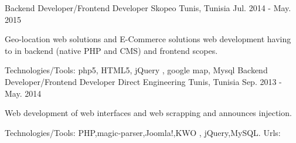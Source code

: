 \begin{cventries}
{    \href{http://www.ozeol.com/fr/}{} \break
    } 
  \techentries
    {Backend Developer/Frontend Developer}
    {Skopeo}
    {Tunis, Tunisia}
    {Jul. 2014 - May. 2015}
    {
      \begin{cvitems}
        \item {Geo-location web solutions and E-Commerce solutions web development having to in backend (native PHP and CMS) and frontend scopes.}
      \end{cvitems}
    }
    {\textcolor{awesome}{Technologies/Tools: } {\color{graytext}}  {php5, HTML5, jQuery , google map, Mysql}}
    {} 
    {
    }          
  \techentries
    {Backend Developer/Frontend Developer}
    {Direct Engineering}
    {Tunis, Tunisia}
    {Sep. 2013 - May. 2014}
    {
      \begin{cvitems}
        \item {Web development of web interfaces and web scrapping and announces injection. }
      \end{cvitems}
    }
    {\textcolor{awesome}{Technologies/Tools: } {\color{graytext}}  {PHP,magic-parser,Joomla!,KWO , jQuery,MySQL.}}
    {Urls:} 
    {\href{http://www.pure-jobs.com/}{} \break
    }       
\end{cventries}
